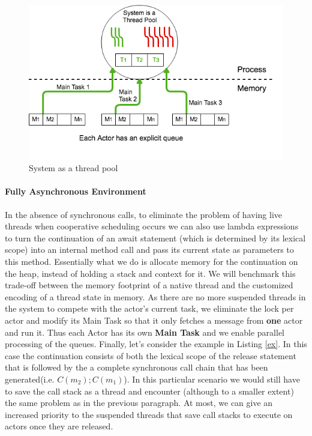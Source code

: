 

\begin{figure}
	\centering
	\includegraphics[scale=0.5]{stp.png}
	\caption{System as a thread pool}
	\label{stp}
	
\end{figure}

\paragraph{Fully Asynchronous Environment}
In the absence of synchronous calls, to eliminate the problem of having live threads when cooperative scheduling occurs we can also use lambda expressions to turn the continuation of an await statement (which is determined by its lexical scope) into an internal method call and pass its current state as parameters to this method. Essentially what we do is allocate memory for the continuation on the heap, instead of holding a stack and context for it. We will benchmark this trade-off between the memory footprint of a native thread and the customized encoding of a thread state in memory. As there are no more suspended threads in the system to compete with the actor's current task, we eliminate the lock per actor and modify its Main Task so that it only fetches a message from \textbf{one} actor and run it. Thus each Actor has its own \textbf{Main Task} and we enable parallel processing of the queues. Finally, let's consider the example in Listing \ref{ex}. In this case the continuation consists of both the lexical scope of the release statement that is followed by the a complete synchronous call chain that has been generated(i.e. $C(m_2);C(m_1)$). In this particular scenario we would still have to save the call stack as a thread and encounter (although to a smaller extent) the same problem as in the previous paragraph. At most, we can give an increased priority to the suspended threads that save call stacks to execute on actors once they are released.
  
